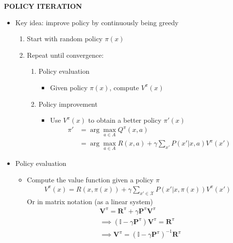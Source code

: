 \begin{whitebox}{\textbf{POLICY ITERATION}}
    \begin{itemize}
        \item Key idea: improve policy by continuously being greedy
        \begin{enumerate}
            \item Start with random policy $\pi(x)$
            \item Repeat until convergence:
            \begin{enumerate}
                \item Policy evaluation
                \begin{itemize}
                    \item Given policy $\pi(x)$, compute $V^\pi(x)$
                \end{itemize}
                \item Policy improvement
                \begin{itemize}
                    \item Use $V^\pi(x)$ to obtain a better policy $\pi'(x)$
                    \begin{align*}
                        \pi'&=\arg\max_{a\in A}Q^\pi(x,a)\\
                        &=\arg\max_{a\in A}R(x,a)+\gamma\sum_{x'}P(x'|x,a)V^\pi(x')
                    \end{align*}
                \end{itemize}
            \end{enumerate}
        \end{enumerate}
        \item Policy evaluation
        \begin{itemize}
            \item Compute the value function given a policy $\pi$
            \begin{align*}
                V^\pi(x)=R(x,\pi(x))+\gamma\sum_{x'\in\mathcal{X}}P(x'|x,\pi(x))V^\pi(x')
            \end{align*}
            Or in matrix notation (as a linear system)
            \begin{align*}
                &\bm{V}^\pi=\bm{R}^\pi+\gamma\bm{P}^\pi\bm{V}^\pi\\
                &\implies(\mathbb{I}-\gamma\bm{P}^\pi)\bm{V}^\pi=\bm{R}^\pi\\
                &\implies\bm{V}^\pi=(\mathbb{I}-\gamma\bm{P}^\pi)^{-1}\bm{R}^\pi
            \end{align*}

\end{itemize}
\end{itemize}
\end{whitebox}

